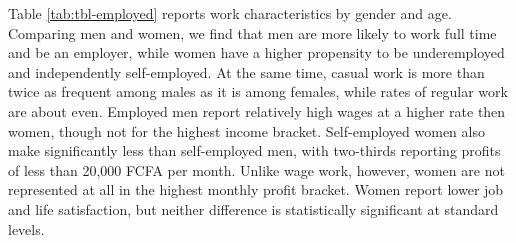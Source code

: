 \documentclass[
  a4paper, twoside, 12pt]{book}
\begin{document}
Table \ref{tab:tbl-employed} reports work characteristics by gender and age. Comparing men and women, we find that men are more likely to work full time and be an employer, while women have a higher propensity to be underemployed and independently self-employed. At the same time, casual work is more than twice as frequent among males as it is among females, while rates of regular work are about even. Employed men report relatively high wages at a higher rate then women, though not for the highest income bracket. Self-employed women also make significantly less than self-employed men, with two-thirds reporting profits of less than 20,000 FCFA per month. Unlike wage work, however, women are not represented at all in the highest monthly profit bracket. Women report lower job and life satisfaction, but neither difference is statistically significant at standard levels.
\end{document}
